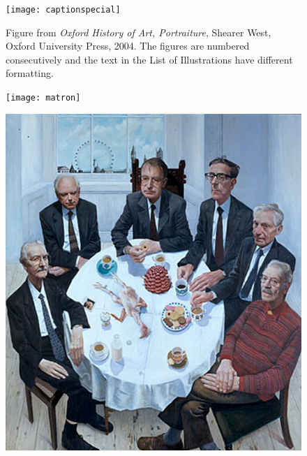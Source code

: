 \def\doubletakeimage{%
  \renewcommand{\topfraction}{.95}  %
  \begin{figure}[t]
    \thispagestyle{caption}
    \texttt{[image: matron]}%
  \end{figure}

  \begin{figure}[tp]
   \hspace*{-\marginparwidth}\includegraphics[height=0.9\textheight]{stuartpearson}
 \end{figure}
}




\lipsum[1-4]
\begin{figure}[htp]
\texttt{[image: captionspecial]}
\centering
\caption{Figure from \textit{Oxford History of Art, Portraiture}, Shearer West, Oxford University Press, 2004. The figures are numbered consecutively and the text in the List of Illustrations have different formatting.}
\end{figure}

\doubletakeimage


\restoregeometry

\addtocounter{chapter}{-2}

\@toctrue\@specialtrue
